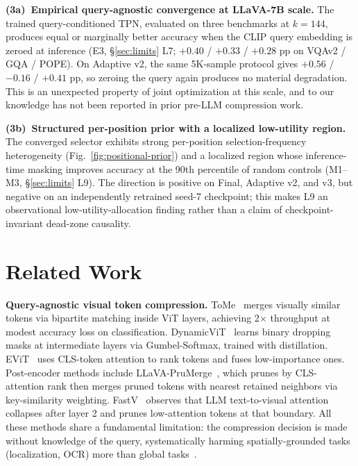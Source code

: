 \documentclass{article}
\begin{document}
\textbf{(3a)~Empirical query-agnostic convergence at LLaVA-7B scale.}
The trained query-conditioned TPN, evaluated on three benchmarks at
$k{=}144$, produces equal or marginally better accuracy when the CLIP query
embedding is zeroed at inference (E3, \S\ref{sec:limits} L7; $+0.40$ /
$+0.33$ / $+0.28$ pp on VQAv2 / GQA / POPE). On Adaptive v2, the same
5K-sample protocol gives $+0.56$ / $-0.16$ / $+0.41$ pp, so zeroing the query
again produces no material degradation. This is an unexpected property of joint
optimization at this scale, and to our knowledge has not been reported in prior
pre-LLM compression work.

\textbf{(3b)~Structured per-position prior with a localized low-utility
region.}
The converged selector exhibits strong per-position selection-frequency
heterogeneity (Fig.~\ref{fig:positional-prior}) and a localized region whose
inference-time masking improves accuracy at the 90th percentile of random
controls (M1--M3, \S\ref{sec:limits} L9). The direction is positive on Final,
Adaptive v2, and v3, but negative on an independently retrained seed-7
checkpoint; this makes L9 an observational low-utility-allocation finding
rather than a claim of checkpoint-invariant dead-zone causality.

\section{Related Work}
\label{sec:related}

\textbf{Query-agnostic visual token compression.}
ToMe~\cite{bolya2022token} merges visually similar tokens via bipartite matching inside
ViT layers, achieving 2$\times$ throughput at modest accuracy loss on classification.
DynamicViT~\cite{rao2021dynamicvit} learns binary dropping masks at intermediate layers
via Gumbel-Softmax, trained with distillation.
EViT~\cite{liang2022evit} uses CLS-token attention to rank tokens and fuses low-importance
ones.
Post-encoder methods include LLaVA-PruMerge~\cite{shang2024llava}, which prunes by
CLS-attention rank then merges pruned tokens with nearest retained neighbors via
key-similarity weighting.
FastV~\cite{chen2024fastv} observes that LLM text-to-visual attention collapses after
layer 2 and prunes low-attention tokens at that boundary.
All these methods share a fundamental limitation: the compression decision is made
without knowledge of the query, systematically harming spatially-grounded tasks
(localization, OCR) more than global tasks~\cite{chen2024fastv, endo2025feather}.
\end{document}
